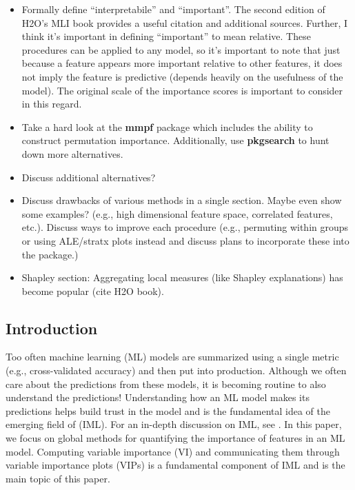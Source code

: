 \begin{itemize}
\item
  Formally define ``interpretabile'' and ``important''. The second
  edition of H2O's MLI book provides a useful citation and additional
  sources. Further, I think it's important in defining ``important'' to
  mean relative. These procedures can be applied to any model, so it's
  important to note that just because a feature appears more important
  relative to other features, it does not imply the feature is
  predictive (depends heavily on the usefulness of the model). The
  original scale of the importance scores is important to consider in
  this regard.
\item
  Take a hard look at the \textbf{mmpf} package which includes the
  ability to construct permutation importance. Additionally, use
  \textbf{pkgsearch} to hunt down more alternatives.
\item
  Discuss additional alternatives?
\item
  Discuss drawbacks of various methods in a single section. Maybe even
  show some examples? (e.g., high dimensional feature space, correlated
  features, etc.). Discuss ways to improve each procedure (e.g.,
  permuting within groups or using ALE/stratx plots instead and discuss
  plans to incorporate these into the package.)
\item
  Shapley section: Aggregating local measures (like Shapley
  explanations) has become popular (cite H2O book).
\end{itemize}

\hypertarget{introduction}{%
\subsection{Introduction}\label{introduction}}

Too often machine learning (ML) models are summarized using a single
metric (e.g., cross-validated accuracy) and then put into production.
Although we often care about the predictions from these models, it is
becoming routine to also understand the predictions! Understanding how
an ML model makes its predictions helps build trust in the model and is
the fundamental idea of the emerging field of
 (IML). For an in-depth discussion
on IML, see \citet{molnar-2019-iml}. In this paper, we focus on global
methods for quantifying the importance of features in an ML model.
Computing variable importance (VI) and communicating them through
variable importance plots (VIPs) is a fundamental component of IML and
is the main topic of this paper.

